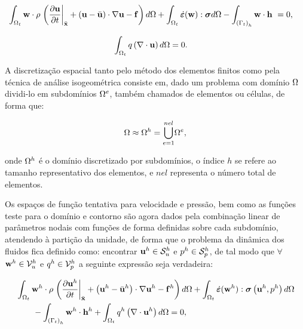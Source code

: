 \documentclass[tese_patricia]{subfiles}%
\begin{document}
\begin{align}
\int_{\Omega_t} \mathbf{w} \cdot \rho \left . \left(\frac{\partial\mathbf{u}}{\partial t} \right|_{\bar{\mathbf{x}}} + \left(\mathbf{u} - \bar{\mathbf{u}}\right)\cdot\nabla\mathbf{u} - \mathbf{f} \right) d\Omega + \int_{\Omega_t} \dot{\bm{\varepsilon}}(\mathbf{w}) : \boldsymbol{\sigma}  d\Omega - \int_{\left(\Gamma_{t}\right)_h} \mathbf{w} \cdot \mathbf{h} \  &= 0,  \label{eq:NSWeakForm1} 
\end{align}

\begin{align}
\int_{\Omega_t} q \left(\nabla \cdot \mathbf{u}\right) d \Omega &= 0. \label{eq:CWeakForm1} 
\end{align}

A discretização espacial tanto pelo método dos elementos finitos como pela técnica de análise isogeométrica consiste em, dado um problema com domínio $\Omega$ dividi-lo em subdomínios $\Omega^{e}$, também chamados de elementos ou células, de forma que:

\begin{align}
\Omega \approx \Omega^{h} = {\bigcup_{e = 1}^{nel}} \Omega^{e},
\end{align}

\noindent onde $\Omega^{h}$ é o domínio discretizado por subdomínios, o índice $h$ se refere ao tamanho representativo dos elementos, e $nel$ representa o número total de elementos.

Os espaços de função tentativa para velocidade e pressão, bem como as funções teste para o domínio e contorno são agora dados pela combinação linear de parâmetros nodais com funções de forma definidas sobre cada subdomínio, atendendo à partição da unidade, de forma que o problema da dinâmica dos fluidos fica definido como: encontrar $\mathbf{u}^h \in \mathcal{S}_u^h$ e $p^h \in \mathcal{S}_p^h$, de tal modo que $\forall$ $\mathbf{w}^h \in \mathcal{V}_u^h$ e $q^h \in \mathcal{V}_p^h$ a seguinte expressão seja verdadeira:


\begin{align}
\begin{split}
&\int_{\Omega_t} \mathbf{w}^h \cdot \rho \left . \left(\frac{\partial\mathbf{u}^h}{\partial t} \right|_{\bar{\mathbf{x}}} + \left(\mathbf{u}^h - \bar{\mathbf{u}}^h\right)\cdot\nabla\mathbf{u}^h - \mathbf{f}^{h}\right) d\Omega + \int_{\Omega_t} \dot{\bm{\varepsilon}}(\mathbf{w}^h) : \boldsymbol{\sigma}\left(\mathbf{u}^h,p^h \right)  d\Omega\\ &\qquad- \int_{\left(\Gamma_{t}\right)_h} \mathbf{w}^h \cdot \mathbf{h}^{h} + \int_{\Omega_t} q^h \left(\nabla \cdot \mathbf{u}^h\right) d \Omega = 0,  \label{eq:NSWeakForm2} 
\end{split}
\end{align}
\end{document}
